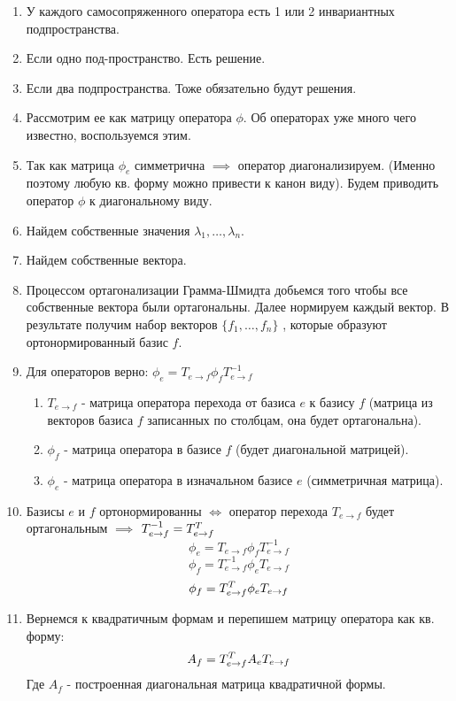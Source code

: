 \documentclass[a4paper,12pt,twoside]{article}
\begin{document}
\begin{enumerate}
\item У каждого самосопряженного оператора есть 1 или 2 инвариантных подпространства.
\item Если одно под-пространство. Есть решение.
\item Если два подпространства. Тоже обязательно будут решения.
\item Рассмотрим ее как матрицу оператора $\phi$. Об операторах уже много чего известно, воспользуемся этим.
\item Так как матрица $\phi_e$ симметрична $ \implies $ оператор диагонализируем. (Именно поэтому любую кв. форму можно привести к канон виду). Будем приводить оператор $\phi$ к диагональному виду.  
\item Найдем собственные значения $\lambda_1, \dots, \lambda_n $.
\item Найдем собственные вектора.
\item Процессом ортагонализации Грамма-Шмидта добьемся того 
чтобы все собственные вектора были ортагональны. Далее нормируем каждый вектор. 
В результате получим набор векторов $\{ f_1, \dots, f_n \}$
, которые образуют ортонормированный базис $f$.
\item Для операторов верно: {\large $\phi_e = T_{e \rightarrow f} \phi_f T_{e \rightarrow f}^{-1}$ }
\begin{enumerate}
\item[] $ T_{e \rightarrow f} $ - матрица оператора перехода от базиса $e$ к базису $f$ (матрица из векторов базиса $f$ записанных по столбцам, она будет ортагональна).
\item[] $ \phi_{f} $ - матрица оператора в базисе $f$ (будет диагональной матрицей).
\item[] $ \phi_{e} $ - матрица оператора в изначальном базисе $e$ (симметричная матрица).
\end{enumerate}
\item Базисы $e$ и $f$ ортонормированны 
$\iff $ 
оператор перехода $T_{e \rightarrow f} $ будет ортагональным
$ \implies $
$ T_{e \rightarrow f}^{-1} = T_{e \rightarrow f}^{{\small T}}  $
\[
\phi_e = T_{e \rightarrow f} \phi_f T_{e \rightarrow f}^{-1}
\]
\[
\phi_{f} = T_{e \rightarrow f}^{-1} \phi_{e} T_{e \rightarrow f}
\]
\[
\phi_{f} = T_{e \rightarrow f}^{{\small T}} \phi_{e} T_{e \rightarrow f}
\]
\item Вернемся к квадратичным формам и перепишем матрицу оператора как кв. форму:
\[
A_{f} = T_{e \rightarrow f}^{{\small T}} A_{e} T_{e \rightarrow f}
\]
Где $ A_{f} $ - построенная диагональная матрица квадратичной формы. 

\end{enumerate}
\end{document}
